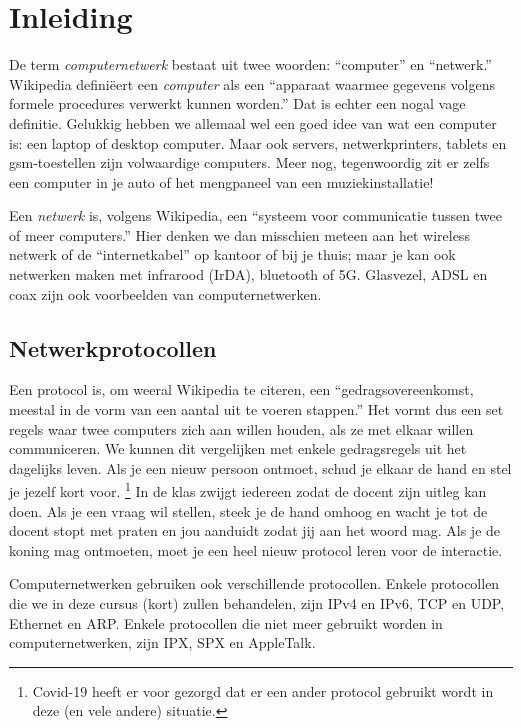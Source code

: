 \chapter{Inleiding}

De term \emph{computernetwerk} bestaat uit twee woorden: ``computer'' en ``netwerk.''
Wikipedia definiëert een \emph{computer} als een ``apparaat waarmee gegevens volgens formele procedures verwerkt kunnen worden.''
Dat is echter een nogal vage definitie.
Gelukkig hebben we allemaal wel een goed idee van wat een computer is: een laptop of desktop computer.
Maar ook servers, netwerkprinters, tablets en gsm-toestellen zijn volwaardige computers.
Meer nog, tegenwoordig zit er zelfs een computer in je auto of het mengpaneel van een muziekinstallatie!

Een \emph{netwerk} is, volgens Wikipedia, een ``systeem voor communicatie tussen twee of meer computers.''
Hier denken we dan misschien meteen aan het wireless netwerk of de ``internetkabel'' op kantoor of bij je thuis;
maar je kan ook netwerken maken met infrarood (IrDA), bluetooth of 5G.
Glasvezel, ADSL en coax zijn ook voorbeelden van computernetwerken.



\section{Netwerkprotocollen}

Een protocol is, om weeral Wikipedia te citeren, een ``gedragsovereenkomst, meestal in de vorm van een aantal uit te voeren stappen.''
Het vormt dus een set regels waar twee computers zich aan willen houden, als ze met elkaar willen communiceren.
We kunnen dit vergelijken met enkele gedragsregels uit het dagelijks leven.
Als je een nieuw persoon ontmoet, schud je elkaar de hand en stel je jezelf kort voor.%
  \footnote{Covid-19 heeft er voor gezorgd dat er een ander protocol gebruikt wordt in deze (en vele andere) situatie.}
In de klas zwijgt iedereen zodat de docent zijn uitleg kan doen.
Als je een vraag wil stellen, steek je de hand omhoog en wacht je tot de docent stopt met praten en jou aanduidt zodat jij aan het woord mag.
Als je de koning mag ontmoeten, moet je een heel nieuw protocol leren voor de interactie.

Computernetwerken gebruiken ook verschillende protocollen.
Enkele protocollen die we in deze cursus (kort) zullen behandelen, zijn
IPv4 en IPv6, TCP en UDP, Ethernet en ARP.
Enkele protocollen die niet meer gebruikt worden in computernetwerken, zijn IPX, SPX en AppleTalk.



